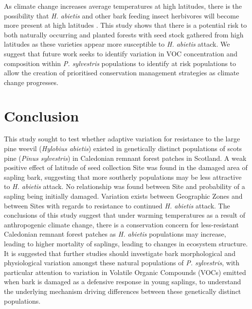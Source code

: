 \documentclass[a4paper, 11pt]{article}
\begin{document}
As climate change increases average temperatures at high latitudes, there is the possibility that \textit{H. abietis} and other bark feeding insect herbivores will become more present at high latitudes \citep{Inward2012}. This study shows that there is a potential risk to both naturally occurring and planted forests with seed stock gathered from high latitudes as these varieties appear more susceptible to \textit{H. abietis} attack. We suggest that future work seeks to identify variation in VOC concentration and composition within \textit{P. sylvestris} populations to identify at risk populations to allow the creation of prioritised conservation management strategies as climate change progresses.

\section*{Conclusion}

This study sought to test whether adaptive variation for resistance to the large pine weevil (\textit{Hylobius abietis}) existed in genetically distinct populations of scots pine (\textit{Pinus sylvestris}) in Caledonian remnant forest patches in Scotland. A weak positive effect of latitude of seed collection Site was found in the damaged area of sapling bark, suggesting that more southerly populations may be less attractive to \textit{H. abietis} attack. No relationship was found between Site and probability of a sapling being initially damaged. Variation exists between Geographic Zones and between Sites with regards to resistance to continued \textit{H. abietis} attack. The conclusions of this study suggest that under warming temperatures as a result of anthropogenic climate change, there is a conservation concern for less-resistant Caledonian remnant forest patches as \textit{H. abietis} populations may increase, leading to higher mortality of saplings, leading to changes in ecosystem structure. It is suggested that further studies should investigate bark morphological and physiological variation amongst these natural populations of \textit{P. sylvestris}, with particular attention to variation in Volatile Organic Compounds (VOCs) emitted when bark is damaged as a defensive response in young saplings, to understand the underlying mechanism driving differences between these genetically distinct populations.



\end{document}
